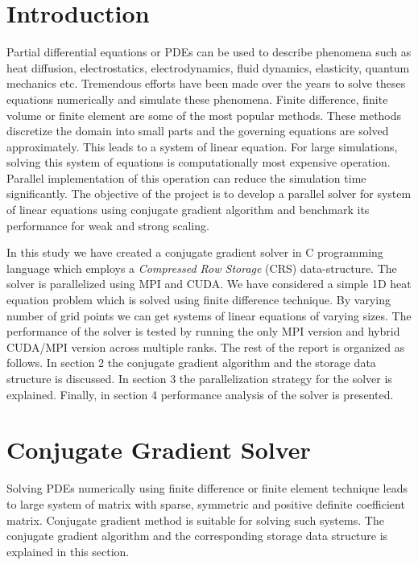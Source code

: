 \documentclass[sigplan,screen]{acmart}
\begin{document}
\maketitle

\section{Introduction}
Partial differential equations or PDEs can be used to describe phenomena such as heat diffusion, electrostatics, electrodynamics, fluid dynamics, elasticity, quantum mechanics etc. Tremendous efforts have been made over the years to solve theses equations numerically and simulate these phenomena. Finite difference, finite volume or finite element are some of the most popular methods. These methods discretize the domain into small parts and the governing equations are solved approximately. This leads to a system of linear equation. For large simulations, solving this system of equations is computationally most expensive operation. Parallel implementation of this operation can reduce the simulation time significantly. The objective of the project is to develop a parallel solver for system of linear equations using conjugate gradient algorithm and benchmark its performance for weak and strong scaling.

In this study we have created a conjugate gradient solver in C programming language which employs a \emph{Compressed Row Storage} (CRS) data-structure. The solver is parallelized using MPI and CUDA. We have considered a simple 1D heat equation problem which is solved using finite difference technique. By varying number of grid points we can get systems of linear equations of varying sizes. The performance of the solver is tested by running the only MPI version and hybrid CUDA/MPI version across multiple ranks. The rest of the report is organized as follows. In section 2 the conjugate gradient algorithm and the storage data structure is discussed. In section 3 the parallelization strategy for the solver is explained. Finally, in section 4 performance analysis of the solver is presented. 

\section{Conjugate Gradient Solver}
Solving PDEs numerically using finite difference or finite element technique leads to large system of matrix with sparse, symmetric and positive definite coefficient matrix. Conjugate gradient method \cite{conjugate} is suitable for solving such systems. The conjugate gradient algorithm and the corresponding storage data structure is explained in this section. 
\end{document}
